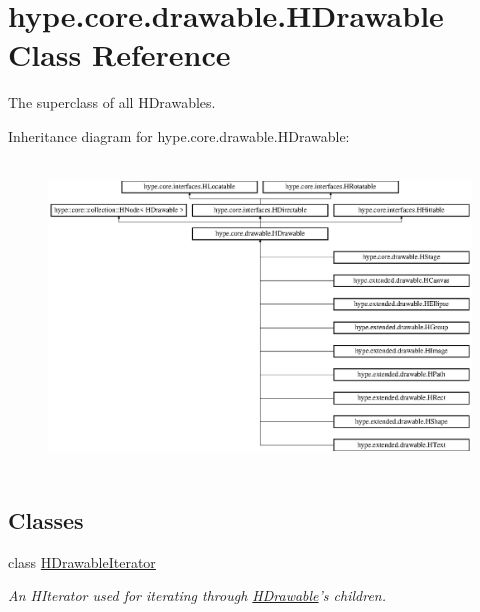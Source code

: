 \hypertarget{classhype_1_1core_1_1drawable_1_1_h_drawable}{\section{hype.\-core.\-drawable.\-H\-Drawable Class Reference}
\label{classhype_1_1core_1_1drawable_1_1_h_drawable}
}


The superclass of all H\-Drawables.  


Inheritance diagram for hype.\-core.\-drawable.\-H\-Drawable\-:\begin{figure}[H]
\begin{center}
\leavevmode
\includegraphics[height=8.235294cm]{classhype_1_1core_1_1drawable_1_1_h_drawable}
\end{center}
\end{figure}
\subsection*{Classes}
\begin{DoxyCompactItemize}
\item 
class \hyperlink{classhype_1_1core_1_1drawable_1_1_h_drawable_1_1_h_drawable_iterator}{H\-Drawable\-Iterator}
\begin{DoxyCompactList}\small\item\em An H\-Iterator used for iterating through \hyperlink{classhype_1_1core_1_1drawable_1_1_h_drawable}{H\-Drawable}'s children. \end{DoxyCompactList}\end{DoxyCompactItemize}
